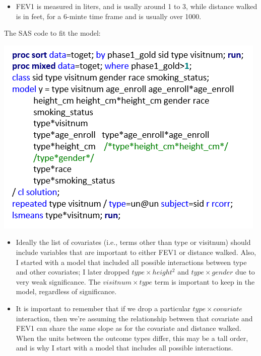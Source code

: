 \documentclass[
  9pt,
  ignorenonframetext,
]{beamer}
\providecommand{\tightlist}{%
  \setlength{\itemsep}{0pt}\setlength{\parskip}{0pt}}
\begin{document}
\begin{frame}{}
\protect\hypertarget{section-5}{}
\begin{itemize}
\tightlist
\item
  FEV1 is measured in liters, and is usally around 1 to 3, while
  distance walked is in feet, for a 6-minte time frame and is usually
  over 1000.
\end{itemize}

The SAS code to fit the model:

\begin{center}\includegraphics[width=1\linewidth]{figs_L8/f5} \end{center}
\end{frame}

\begin{frame}{}
\protect\hypertarget{section-6}{}
\begin{itemize}
\item
  Ideally the list of covariates (i.e., terms other than type or
  visitnum) should include variables that are important to either FEV1
  or distance walked. Also, I started with a model that included all
  possible interactions between type and other covariates; I later
  dropped \(type \times height^2\) and \(type \times gender\) due to
  very weak significance. The \(visitnum \times type\) term is important
  to keep in the model, regardless of significance.
\item
  It is important to remember that if we drop a particular
  \(type \times covariate\) interaction, then we're assuming the
  relationship between that covariate and FEV1 can share the same slope
  as for the covariate and distance walked. When the units between the
  outcome types differ, this may be a tall order, and is why I start
  with a model that includes all possible interactions.
\end{itemize}
\end{frame}
\end{document}
